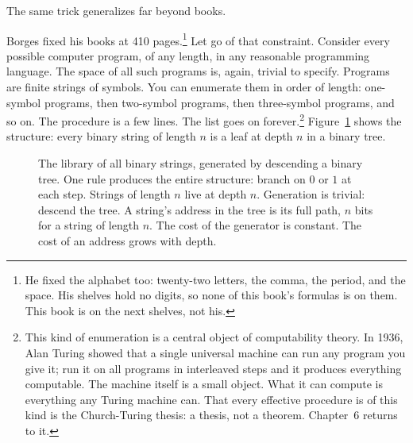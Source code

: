 The same trick generalizes far beyond books.

Borges fixed his books at 410 pages.\footnote{He fixed the alphabet too: twenty-two letters, the comma, the period, and the space. His shelves hold no digits, so none of this book's formulas is on them. This book is on the next shelves, not his.} Let go of that constraint. Consider every possible computer program, of any length, in any reasonable programming language. The space of all such programs is, again, trivial to specify. Programs are finite strings of symbols. You can enumerate them in order of length: one-symbol programs, then two-symbol programs, then three-symbol programs, and so on. The procedure is a few lines. The list goes on forever.\footnote{This kind of enumeration is a central object of computability theory. In 1936, Alan Turing showed that a single universal machine can run any program you give it; run it on all programs in interleaved steps and it produces everything computable. The machine itself is a small object. What it can compute is everything any Turing machine can. That every effective procedure is of this kind is the Church-Turing thesis: a thesis, not a theorem. Chapter~6 returns to it.} Figure~\ref{fig:enumeration-tree} shows the structure: every binary string of length $n$ is a leaf at depth $n$ in a binary tree.

\begin{figure}[h]
\centering
{}
\caption{The library of all binary strings, generated by descending a binary tree. One rule produces the entire structure: branch on $0$ or $1$ at each step. Strings of length $n$ live at depth $n$. Generation is trivial: descend the tree. A string's address in the tree is its full path, $n$ bits for a string of length $n$. The cost of the generator is constant. The cost of an address grows with depth.}
\label{fig:enumeration-tree}
\end{figure}

